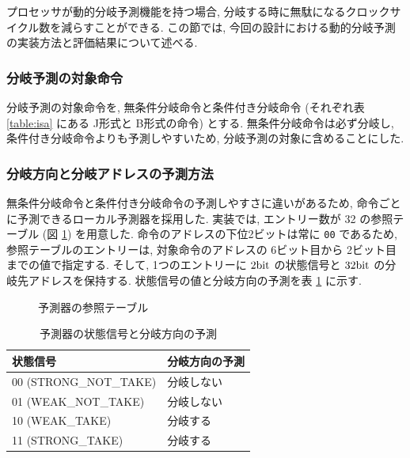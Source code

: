\documentclass[../improvements.tex]{subflies}
\begin{document}
  プロセッサが動的分岐予測機能を持つ場合, 
  分岐する時に無駄になるクロックサイクル数を減らすことができる.
  この節では, 今回の設計における動的分岐予測の実装方法と評価結果について述べる.

  \subsubsection{分岐予測の対象命令}
  分岐予測の対象命令を, 無条件分岐命令と条件付き分岐命令 
  (それぞれ表 \ref{table:isa} にある J形式と B形式の命令) とする.
  無条件分岐命令は必ず分岐し, 条件付き分岐命令よりも予測しやすいため, 
  分岐予測の対象に含めることにした.

  \subsubsection{分岐方向と分岐アドレスの予測方法}
  無条件分岐命令と条件付き分岐命令の予測しやすさに違いがあるため, 
  命令ごとに予測できるローカル予測器を採用した\cite{ca-quantitative-approach}.
  実装では, エントリー数が 32 の参照テーブル (図 \ref{fig:predictor-table}) を用意した.
  命令のアドレスの下位2ビットは常に \verb|00| であるため, 
  参照テーブルのエントリーは, 対象命令のアドレスの 6ビット目から 2ビット目までの値で指定する.
  そして, 1つのエントリーに $2\unit{\bit}$ の状態信号と $32\unit{\bit}$ の分岐先アドレスを保持する.
  状態信号の値と分岐方向の予測を表 \ref{table:predictor-state} に示す.

  \begin{figure}
    \caption{予測器の参照テーブル}
    \label{fig:predictor-table}
  \end{figure}

  \begin{table}[t]
    \centering
    \caption{予測器の状態信号と分岐方向の予測}
    \label{table:predictor-state}
    \begin{tabular}{|l|l|}
    \hline
    状態信号 & 分岐方向の予測 \\ \hline
    00 (STRONG\_NOT\_TAKE) & 分岐しない \\
    01 (WEAK\_NOT\_TAKE) & 分岐しない \\
    10 (WEAK\_TAKE) & 分岐する \\
    11 (STRONG\_TAKE) & 分岐する \\ \hline
    \end{tabular}
  \end{table}
\end{document}
